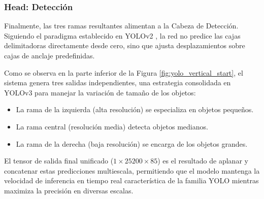 \documentclass{article}
\begin{document}
	\subsubsection{Head: Detección} Finalmente, las tres ramas resultantes alimentan a la Cabeza de Detección. Siguiendo el paradigma establecido en YOLOv2 \cite{redmon2016yolo9000betterfasterstronger}, la red no predice las cajas delimitadoras directamente desde cero, sino que ajusta desplazamientos sobre cajas de anclaje predefinidas.
	
	
	Como se observa en la parte inferior de la Figura \ref{fig:yolo_vertical_start}, el sistema genera tres salidas independientes, una estrategia consolidada en YOLOv3 \cite{redmon2018yolov3incrementalimprovement} para manejar la variación de tamaño de los objetos:
	\begin{itemize}
		\item La rama de la izquierda (alta resolución) se especializa en objetos pequeños.
		\item La rama central (resolución media) detecta objetos medianos.
		\newpage
		\item La rama de la derecha (baja resolución) se encarga de los objetos grandes.
	\end{itemize}
	
	El tensor de salida final unificado ($1 \times 25200 \times 85$) es el resultado de aplanar y concatenar estas predicciones multiescala, permitiendo que el modelo mantenga la velocidad de inferencia en tiempo real característica de la familia YOLO \cite{redmon2016lookonceunifiedrealtime} mientras maximiza la precisión en diversas escalas.
	
\end{document}
